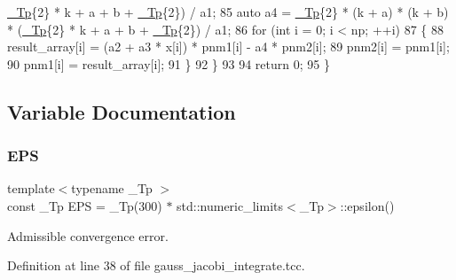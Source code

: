 \begin{DoxyCode}
      \hyperlink{namespace____gnu__cxx_a3b19a9c800ca194374ef9172290f7d79}{\_Tp}\{2\} * k + a + b + \hyperlink{namespace____gnu__cxx_a3b19a9c800ca194374ef9172290f7d79}{\_Tp}\{2\}) / a1;
85         \textcolor{keyword}{auto} a4 = \hyperlink{namespace____gnu__cxx_a3b19a9c800ca194374ef9172290f7d79}{\_Tp}\{2\} * (k + a) * (k + b) * (\hyperlink{namespace____gnu__cxx_a3b19a9c800ca194374ef9172290f7d79}{\_Tp}\{2\} * k + a + b + \hyperlink{namespace____gnu__cxx_a3b19a9c800ca194374ef9172290f7d79}{\_Tp}\{2\}) / a1;
86         \textcolor{keywordflow}{for} (\textcolor{keywordtype}{int} i = 0; i < np; ++i)
87           \{
88             result\_array[i] = (a2 + a3 * x[i]) * pnm1[i] - a4 * pnm2[i];
89             pnm2[i] = pnm1[i];
90             pnm1[i] = result\_array[i];
91           \}
92       \}
93 
94     \textcolor{keywordflow}{return} 0;
95   \}
\end{DoxyCode}


\subsection{Variable Documentation}
\mbox{\label{gauss__jacobi__integrate_8tcc_a4588eefde4c686e65f5f208a3ae06f1f}} 
\subsubsection{\texorpdfstring{E\+PS}{EPS}}
{\footnotesize\ttfamily template$<$typename \+\_\+\+Tp $>$ \\
const \+\_\+\+Tp E\+PS = \+\_\+\+Tp(300) $\ast$ std\+::numeric\+\_\+limits$<$\+\_\+\+Tp$>$\+::epsilon()}



Admissible convergence error. 



Definition at line 38 of file gauss\+\_\+jacobi\+\_\+integrate.\+tcc.

